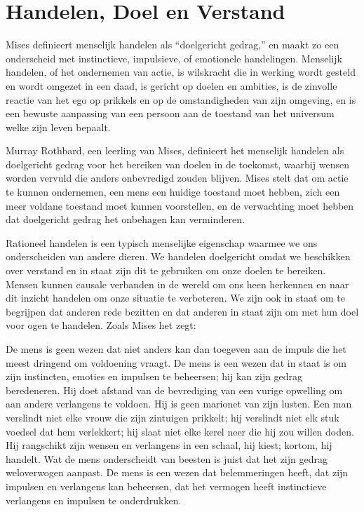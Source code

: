 \section*{Handelen, Doel en Verstand}

Mises definieert menselijk handelen als “doelgericht gedrag,” en maakt zo een onderscheid met instinctieve, impulsieve, of emotionele handelingen.\autocite{2} Menselijk handelen, of het ondernemen van actie, is wilskracht die in werking wordt gesteld en wordt omgezet in een daad, is gericht op doelen en ambities, is de zinvolle reactie van het ego op prikkels en op de omstandigheden van zijn omgeving, en is een bewuste aanpassing van een persoon aan de toestand van het universum welke zijn leven bepaalt.

Murray Rothbard, een leerling van Mises, definieert het menselijk handelen als doelgericht gedrag voor het bereiken van doelen in de toekomst, waarbij wensen worden vervuld die anders onbevredigd zouden blijven.\autocite{3} Mises stelt dat om actie te kunnen ondernemen, een mens een huidige toestand moet hebben, zich een meer voldane toestand moet kunnen voorstellen, en de verwachting moet hebben dat doelgericht gedrag het onbehagen kan verminderen.\autocite{4}

Rationeel handelen is een typisch menselijke eigenschap waarmee we ons onderscheiden van andere dieren. We handelen doelgericht omdat we beschikken over verstand en in staat zijn dit te gebruiken om onze doelen te bereiken. Mensen kunnen causale verbanden in de wereld om ons heen herkennen en naar dit inzicht handelen om onze situatie te verbeteren. We zijn ook in staat om te begrijpen dat anderen rede bezitten en dat anderen in staat zijn om met hun doel voor ogen te handelen. Zoals Mises het zegt:

\begin{blockquotebox}De mens is geen wezen dat niet anders kan dan toegeven aan de impuls die het meest dringend om voldoening vraagt. De mens is een wezen dat in staat is om zijn instincten, emoties en impulsen te beheersen; hij kan zijn gedrag beredeneren. Hij doet afstand van de bevrediging van een vurige opwelling om aan andere verlangens te voldoen. Hij is geen marionet van zijn lusten. Een man verslindt niet elke vrouw die zijn zintuigen prikkelt; hij verslindt niet elk stuk voedsel dat hem verlekkert; hij slaat niet elke kerel neer die hij zou willen doden. Hij rangschikt zijn wensen en verlangens in een schaal, hij kiest; kortom, hij handelt. Wat de mens onderscheidt van beesten is juist dat het zijn gedrag weloverwogen aanpast. De mens is een wezen dat belemmeringen heeft, dat zijn impulsen en verlangens kan beheersen, dat het vermogen heeft instinctieve verlangens en impulsen te onderdrukken.\footnotemark 
\end{blockquotebox}


